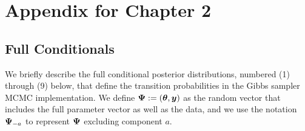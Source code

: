 

\chapter{Appendix for Chapter 2}
\label{appendix_B}

\section{Full Conditionals}
\label{sec:full_cond}

We briefly describe the full conditional posterior distributions,
numbered (1) through (9) below, that define the transition
probabilities in the Gibbs sampler MCMC implementation. We define $\mbox{\boldmath $\Psi$}:=(\mbox{\boldmath $\theta$}, \mbox{\boldmath $y$})$ as the random vector that includes the full parameter vector as well as the data, and we use the notation $\mbox{\boldmath $\Psi$}_{-a}$ to represent $\mbox{\boldmath $\Psi$}$ excluding component $a$.

